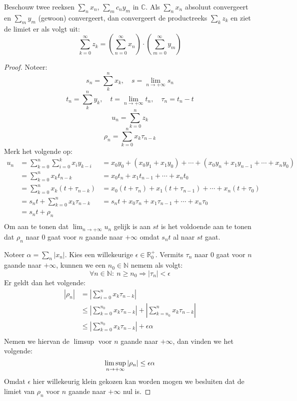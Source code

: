 \documentclass[main.tex]{subfiles}
\begin{document}
\begin{bst}
  Beschouw twee reeksen $\sum_{n}x_{n}$, $\sum_{m}c_{n}y_{m}$ in $\mathbb{C}$.
  Als $\sum_{n}x_{n}$ absoluut convergeert en $\sum_{m}y_{m}$ (gewoon) convergeert, dan convergeert de productreeks $\sum_{k}z_{k}$ en ziet de limiet er als volgt uit:
  \[ \sum_{k=0}^{\infty}z_{k} = \left(\sum_{n=0}^{\infty}x_{n}\right) \cdot \left(\sum_{m=0}^{\infty}y_{m}\right) \]

  \begin{proof}
    Noteer:
    \[
    s_{n} = \sum_{k}^{n}x_{k},\quad
    s = \lim_{n\rightarrow +\infty}s_{n}
    \]
    \[
    t_{n} = \sum_{k}^{n}y_{k},\quad
    t = \lim_{n\rightarrow +\infty}t_{n},\quad
    \tau_{n} = t_{n}-t
    \]
    \[
    u_{n} = \sum_{k=0}^{n}z_{k}
    \]
    \[ \rho_{n} = \sum_{k=0}^{n}x_{k}\tau_{n-k} \]
    Merk het volgende op:
    \[
    \begin{array}{rll}
      u_{n}
      &= \sum_{k=0}^{n}\sum_{i=0}^{k}x_{i}y_{k-i}
      &= x_{0}y_{0} + (x_{0}y_{1}+x_{1}y_{0}) + \dotsb + (x_{0}y_{n} + x_{1}y_{n-1} + \dotsb + x_{n}y_{0})\\
      &= \sum_{k=0}^{n}x_{k}t_{n-k}
      &= x_{0}t_{n} + x_{1}t_{n-1} + \dotsb + x_{n}t_{0}\\
      &= \sum_{k=0}^{n}x_{k}(t+\tau_{n-k})
      &= x_{0}(t+\tau_{n}) + x_{1}(t+\tau_{n-1}) + \dotsb + x_{n}(t+\tau_{0})\\
      &= s_{n}t + \sum_{k=0}^{n}x_{k}\tau_{n-k}
      &= s_{n}t + x_{0}\tau_{n} + x_{1}\tau_{n-1} + \dotsb + x_{n}\tau_{0}\\
      &= s_{n}t + \rho_{n}\\
    \end{array}
    \]
    Om aan te tonen dat $\lim_{n\rightarrow +\infty}u_{n}$ gelijk is aan $st$ is het voldoende aan te tonen dat $\rho_{n}$ naar $0$ gaat voor $n$ gaande naar $+\infty$ omdat $s_{n}t$ al naar $st$ gaat.
    
    Noteer $\alpha = \sum_{n}|x_{n}|$.
    Kies een willekeurige $\epsilon \in \mathbb{R}_{0}^{+}$.
    Vermits $\tau_{n}$ naar $0$ gaat voor $n$ gaande naar $+\infty$, kunnen we een $n_{0}\in \mathbb{N}$ nemem als volgt:
    \[ \forall n\in \mathbb{N}:\ n \ge n_{0} \Rightarrow |\tau_{n}| < \epsilon \]
    Er geldt dan het volgende:
    \[
    \begin{array}{rl}
      |\rho_{n}|
      &= \left|\sum_{i=0}^{n}x_{k}\tau_{n-k}\right|\\
      &\le \left|\sum_{k=0}^{n_{0}}x_{k}\tau_{n-k}\right|+\left|\sum_{k=n_{0}}^{n}x_{k}\tau_{n-k}\right|\\
      &\le \left|\sum_{k=0}^{n_{0}}x_{k}\tau_{n-k}\right|+\epsilon\alpha\\
    \end{array}
    \]
    Nemen we hiervan de $\limsup$ voor $n$ gaande naar $+\infty$, dan vinden we het volgende:
    \[
      \limsup_{n\rightarrow +\infty}|\rho_{n}|
      \le \epsilon\alpha\\
    \]
    Omdat $\epsilon$ hier willekeurig klein gekozen kan worden mogen we besluiten dat de limiet van $\rho_{n}$ voor $n$ gaande naar $+\infty$ nul is.\waarom
  \end{proof}
\end{bst}
\end{document}

